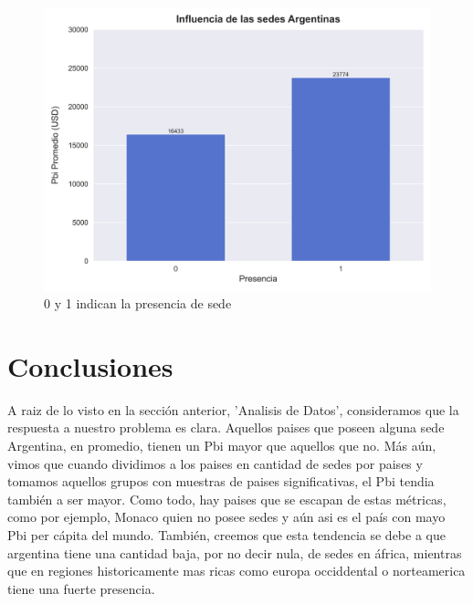 \documentclass[10pt,a4paper]{article}
\begin{document}
\begin{figure}[h!]
  \centering
  \includegraphics[width=1\textwidth]{plot_conclusion.png}
  \caption{0 y 1 indican la presencia de sede}
  \label{fig: 0 y 1 indican la presencia de sedes}
\end{figure} \vspace{0.1cm}

\newpage

\section{Conclusiones} \vspace{0.3cm}

A raiz de lo visto en la sección anterior, 'Analisis de Datos', consideramos que la respuesta a nuestro problema es clara. Aquellos paises que poseen alguna sede Argentina, en promedio, tienen un Pbi mayor que aquellos que no. Más aún, vimos que cuando dividimos a los paises en cantidad de sedes por paises y tomamos aquellos grupos con muestras de paises significativas, el Pbi tendia también a ser mayor. Como todo, hay paises que se escapan de estas métricas, como por ejemplo, Monaco quien no posee sedes y aún asi es el país con mayo Pbi per cápita del mundo. También, creemos que esta tendencia se debe a que argentina tiene una cantidad baja, por no decir nula, de sedes en áfrica, mientras que en regiones historicamente mas ricas como europa occiddental o norteamerica tiene una fuerte presencia.
\end{document}
